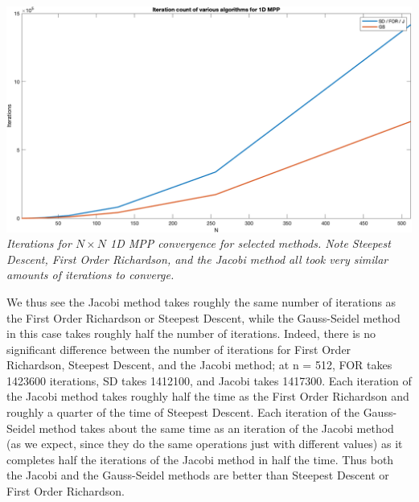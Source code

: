 \documentclass[12pt,letterpaper]{article}
\theoremstyle{definition}
\begin{document}
\begin{center}
\includegraphics[width=15cm]{1Diters.png}\\
    \it Iterations for $N\times N$ 1D MPP convergence for selected methods. Note Steepest Descent, First Order Richardson, and the Jacobi method all took very similar amounts of iterations to converge.
\end{center}
We thus see the Jacobi method takes roughly the same number of iterations as the First Order Richardson or Steepest Descent, while the Gauss-Seidel method in this case takes roughly half the number of iterations. Indeed, there is no significant difference between the number of iterations for First Order Richardson, Steepest Descent, and the Jacobi method; at n = 512, FOR takes 1423600 iterations, SD takes 1412100, and Jacobi takes 1417300. Each iteration of the Jacobi method takes roughly half the time as the First Order Richardson and roughly a quarter of the time of Steepest Descent. Each iteration of the Gauss-Seidel method takes about the same time as an iteration of the Jacobi method (as we expect, since they do the same operations just with different values) as it completes half the iterations of the Jacobi method in half the time. Thus both the Jacobi and the Gauss-Seidel methods are better than Steepest Descent or First Order Richardson.
\end{document}
